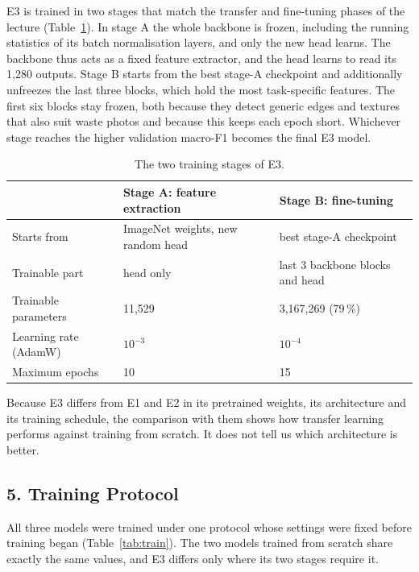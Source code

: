 \documentclass{article}
\begin{document}
E3 is trained in two stages that match the transfer and fine-tuning phases of the lecture \cite{lec53} (Table~\ref{tab:e3}). In stage A the whole backbone is frozen, including the running statistics of its batch normalisation layers, and only the new head learns. The backbone thus acts as a fixed feature extractor, and the head learns to read its 1,280 outputs. Stage B starts from the best stage-A checkpoint and additionally unfreezes the last three blocks, which hold the most task-specific features. The first six blocks stay frozen, both because they detect generic edges and textures that also suit waste photos and because this keeps each epoch short. Whichever stage reaches the higher validation macro-F1 becomes the final E3 model.

\begin{table}[H]
\centering
\caption{The two training stages of E3.}
\label{tab:e3}
\begin{tabularx}{\textwidth}{lXX}
\toprule
 & Stage A: feature extraction & Stage B: fine-tuning \\
\midrule
Starts from & ImageNet weights, new random head & best stage-A checkpoint \\
Trainable part & head only & last 3 backbone blocks and head \\
Trainable parameters & 11,529 & 3,167,269 (79\,\%) \\
Learning rate (AdamW) & $10^{-3}$ & $10^{-4}$ \\
Maximum epochs & 10 & 15 \\
\bottomrule
\end{tabularx}
\end{table}

Because E3 differs from E1 and E2 in its pretrained weights, its architecture and its training schedule, the comparison with them shows how transfer learning performs against training from scratch. It does not tell us which architecture is better.

\subsection{5. Training Protocol}

All three models were trained under one protocol whose settings were fixed before training began (Table~\ref{tab:train}). The two models trained from scratch share exactly the same values, and E3 differs only where its two stages require it.
\end{document}

